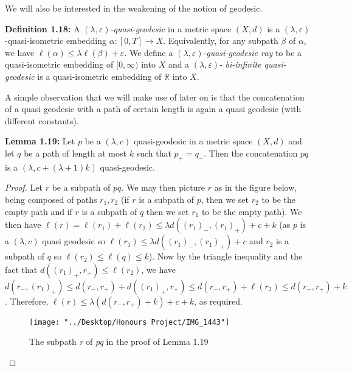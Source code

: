 \documentclass[12pt]{article}
\newcommand{\vs}{\vskip10pt}
\begin{document}
 	\vs 
 	
 	We will also be interested in the weakening of the notion of geodesic. 
 	
 	\vs 
 	
 	\textbf{Definition 1.18: } A $(\lambda, \varepsilon)$\textit{-quasi-geodesic} in a metric space $(X,d)$ is a $(\lambda, \varepsilon)$-quasi-isometric embedding $\alpha: [0,T] \rightarrow X$. Equivalently, for any subpath $\beta$ of $\alpha$, we have $\ell(\alpha) \leq \lambda \ell(\beta) + \varepsilon$. We define a $(\lambda, \varepsilon)$-\textit{guasi-geodesic ray} to be a quasi-isometric embedding of $[0, \infty)$ into $X$ and a $(\lambda, \varepsilon)$-\textit{ bi-infinite quasi-geodesic} is a quasi-isometric embedding of $\mathbb{R}$ into $X$. 
 	
 	\vs 
 	
 	A simple observation that we will make use of later on is that the concatenation of a quasi geodesic with a path of certain length is again a quasi geodesic (with different constants). 
 	
 	\vs 
 	
 	\textbf{Lemma 1.19: } Let $p$ be a $(\lambda, c)$ quasi-geodesic in a metric space $(X,d)$ and let $q$ be a path of length at most $k$ such that $p_{+} = q_{-}$. Then the concatenation $pq$ is a $(\lambda, c + (\lambda + 1)k)$ quasi-geodesic. 
 	
 	\begin{proof}
 		
 		Let $r$ be a subpath of $pq$. We may then picture $r$ as in the figure below, being composed of paths $r_1, r_2$ (if $r$ is a subpath of $p$, then we set $r_2$ to be the empty path and if $r$ is a subpath of $q$ then we set $r_1$ to be the empty path). We then have $\ell(r) = \ell(r_1) + \ell(r_2) \leq \lambda d((r_1)_{-}, (r_1)_{+}) + c + k$ (as $p$ is a $(\lambda, c)$ quasi geodesic so $\ell(r_1) \leq \lambda d((r_1)_{-}, (r_1)_{+}) + c$ and $r_2$ is a subpath of $q$ so $\ell(r_2) \leq \ell(q) \leq k$). Now by the triangle inequality and the fact that $d((r_1)_+, r_+) \leq \ell(r_2)$, we have $d(r_-, (r_1)_+)  \leq d(r_-, r_+) + d((r_1)_+, r_+) \leq d(r_-, r_+) + \ell(r_2) \leq d(r_-, r_+) + k$. Therefore, $\ell(r) \leq \lambda (d(r_-, r_+) + k) + c + k$, as required. 
 		
 		
 		
\begin{figure} [H]
	\centering
	\texttt{[image: "../Desktop/Honours Project/IMG\_1443"]}
	\caption{The subpath \textit{r} of \textit{pq} in the proof of Lemma 1.19}
	\label{fig:img1443}
\end{figure}
 	\end{proof}
 	
\end{document}

